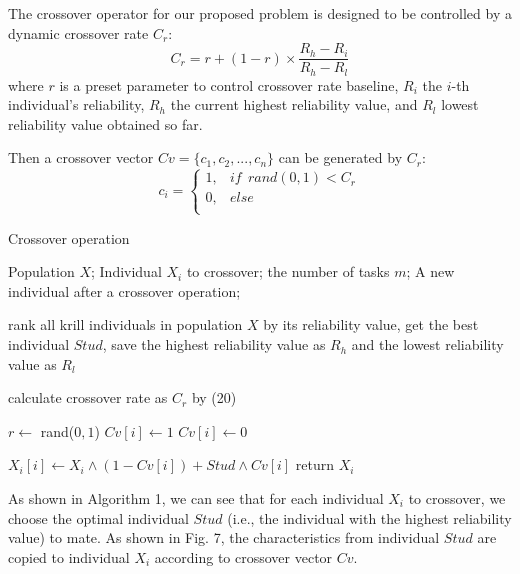 \documentclass[journal]{IEEEtran}
\begin{document}
The crossover operator for our proposed problem is designed to be controlled by a dynamic crossover rate $C_{r}$:
\begin{equation}
C_{r} = r + (1-r) \times \frac{R_{h}-R_{i}}{R_{h}-R_{l}}
\end{equation}
where $r$ is a preset parameter to control crossover rate baseline, $R_{i}$ the $i$-th individual's reliability, $R_{h}$ the current highest reliability value, and $R_{l}$ lowest reliability value obtained so far.

Then a crossover vector $Cv = \{c_{1},c_{2},...,c_{n}\}$ can be generated by $C_{r}$:
\begin{equation}
c_{i}=
\begin{cases}
1,& if \ \ rand(0,1) < C_{r}\\
0,& else\\
\end{cases}
\end{equation}

\begin{algorithm}
\caption{Crossover operation}
\label{Crossover operation}
\begin{algorithmic}[1]

\REQUIRE Population $X$; Individual $X_i$ to crossover; the number of tasks $m$; 
\ENSURE A new individual after a crossover operation;

\STATE rank all krill individuals in population $X$ by its reliability value, get the best individual $Stud$, save the highest reliability value as $R_{h}$ and the lowest reliability value as $R_{l}$

\STATE calculate crossover rate as $C_{r}$ by (20)

\STATE $r \leftarrow$ rand($0,1$)
\STATE $Cv[i] \leftarrow 1$
\ELSE
\STATE $Cv[i] \leftarrow 0$
\ENDIF
\ENDFOR

\STATE $X_i[i] \leftarrow X_i \wedge  (1-Cv[i]) + Stud \wedge Cv[i]$ 
\ENDFOR
\STATE return $X_i$
\end{algorithmic}
\end{algorithm}

As shown in Algorithm 1, we can see that for each individual $X_i$ to crossover, we choose the optimal individual $Stud$ (i.e., the individual with the highest reliability value) to mate. As shown in Fig. 7, the characteristics from individual $Stud$ are copied to individual $X_i$ according to crossover vector $Cv$. 
\end{document}

